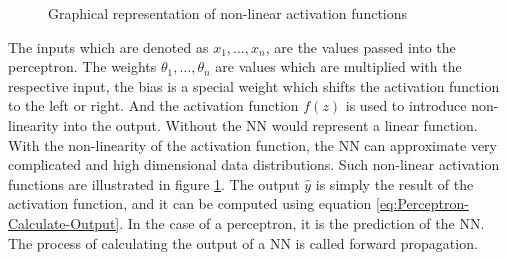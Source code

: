 \begin{figure}[htbp]
    \centering
    \caption{Graphical representation of non-linear activation functions}
    \label{fig:Activation-Functions}
\end{figure}
\noindent
The inputs which are denoted as $x_1, \dots, x_n$, are the values passed into the perceptron. The weights $\theta_{1}, \dots, \theta_{n}$ are values which are multiplied with the respective input, the bias is a special weight which shifts the activation function to the left or right. And the activation function $f(z)$ is used to introduce non-linearity into the output. Without the \gls{NN} would represent a linear function. With the non-linearity of the activation function, the \gls{NN} can approximate very complicated and high dimensional data distributions. Such non-linear activation functions are illustrated in figure \ref{fig:Activation-Functions}. The output $\hat{y}$ is simply the result of the activation function, and it can be computed using equation \ref{eq:Perceptron-Calculate-Output}. In the case of a perceptron, it is the prediction of the \gls{NN}. The process of calculating the output of a \gls{NN} is called forward propagation.
